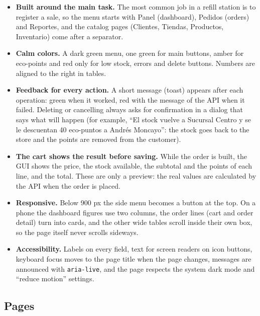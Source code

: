 \documentclass[11pt]{article}
\renewcommand{\_}{\oldus\allowbreak}
\begin{document}
\begin{itemize}[itemsep=0.2em]
  \item \textbf{Built around the main task.} The most common job in a refill station is to register
  a sale, so the menu starts with Panel (dashboard), Pedidos (orders) and Reportes, and the catalog
  pages (Clientes, Tiendas, Productos, Inventario) come after a separator.
  \item \textbf{Calm colors.} A dark green menu, one green for main buttons, amber for eco-points
  and red only for low stock, errors and delete buttons. Numbers are aligned to the right in tables.
  \item \textbf{Feedback for every action.} A short message (toast) appears after each operation:
  green when it worked, red with the message of the API when it failed. Deleting or cancelling
  always asks for confirmation in a dialog that says what will happen (for example, ``El stock
  vuelve a Sucursal Centro y se le descuentan 40 eco-puntos a Andrés Moncayo'': the stock goes back
  to the store and the points are removed from the customer).
  \item \textbf{The cart shows the result before saving.} While the order is built, the GUI shows
  the price, the stock available, the subtotal and the points of each line, and the total. These
  are only a preview: the real values are calculated by the API when the order is placed.
  \item \textbf{Responsive.} Below 900 px the side menu becomes a button at the top. On a phone the
  dashboard figures use two columns, the order lines (cart and order detail) turn into cards, and
  the other wide tables scroll inside their own box, so the page itself never scrolls sideways.
  \item \textbf{Accessibility.} Labels on every field, text for screen readers on icon buttons,
  keyboard focus moves to the page title when the page changes, messages are announced with
  \texttt{aria-live}, and the page respects the system dark mode and ``reduce motion'' settings.
\end{itemize}

\subsection{Pages}
\end{document}
